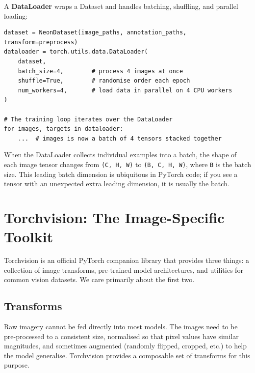 \documentclass[11pt, a4paper]{article}
\newenvironment{note}{%
  \begin{tcolorbox}[
    colback=notebg, colframe=noteframe,
    fonttitle=\bfseries, title=Note,
    breakable, enhanced
  ]
}{%
  \end{tcolorbox}
}
\begin{document}
A \textbf{DataLoader} wraps a Dataset and handles batching, shuffling, and
parallel loading:

\begin{lstlisting}
dataset = NeonDataset(image_paths, annotation_paths, transform=preprocess)
dataloader = torch.utils.data.DataLoader(
    dataset,
    batch_size=4,        # process 4 images at once
    shuffle=True,        # randomise order each epoch
    num_workers=4,       # load data in parallel on 4 CPU workers
)

# The training loop iterates over the DataLoader
for images, targets in dataloader:
    ...  # images is now a batch of 4 tensors stacked together
\end{lstlisting}

\begin{note}
  When the DataLoader collects individual examples into a batch, the shape of
  each image tensor changes from \lstinline{(C, H, W)} to
  \lstinline{(B, C, H, W)}, where \lstinline{B} is the batch size. This
  leading batch dimension is ubiquitous in PyTorch code; if you see a tensor
  with an unexpected extra leading dimension, it is usually the batch.
\end{note}

\section{Torchvision: The Image-Specific Toolkit}

Torchvision is an official PyTorch companion library that provides three
things: a collection of image transforms, pre-trained model architectures, and
utilities for common vision datasets. We care primarily about the first two.

\subsection{Transforms}

Raw imagery cannot be fed directly into most models. The images need to be
pre-processed to a consistent size, normalised so that pixel values have
similar magnitudes, and sometimes augmented (randomly flipped, cropped, etc.)
to help the model generalise. Torchvision provides a composable set of
transforms for this purpose.
\end{document}
